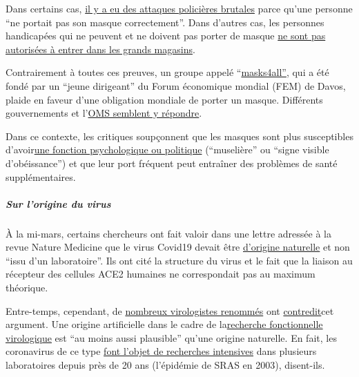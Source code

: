 Dans certains cas,
\href{https://twitter.com/DrRJKavanagh/status/1260739779177656325}{il y
a eu des attaques policières brutales} parce qu'une personne ``ne
portait pas son masque correctement''. Dans d'autres cas, les personnes
handicapées qui ne peuvent et ne doivent pas porter de masque
\href{https://bnn.de/lokales/karlsruhe/maskenpflicht-behinderte-sind-befreit-und-werden-dafuer-teils-beschimpft}{ne
sont pas autorisées à entrer dans les grands magasins}.

Contrairement à toutes ces preuves, un groupe appelé
``\href{https://masks4all.co/about-us/}{masks4all''}, qui a été fondé
par un ``jeune dirigeant'' du Forum économique mondial (FEM) de Davos,
plaide en faveur d'une obligation mondiale de porter un masque.
Différents gouvernements et
l'\href{https://www.businessinsider.com/who-updates-face-masks-recommendations-amid-the-coronavirus-pandemic-2020-6}{OMS
semblent y répondre}.

Dans ce contexte, les critiques soupçonnent que les masques sont plus
susceptibles
d'avoir\href{https://multipolar-magazin.de/artikel/maskenpflicht-gesellschaftliches-klima}{une
fonction psychologique ou politique} (``muselière'' ou ``signe visible
d'obéissance'') et que leur port fréquent peut entraîner des problèmes
de santé supplémentaires.

\hypertarget{sur-lorigine-du-virus}{%
\subparagraph{\texorpdfstring{\textbf{Sur l'origine du
virus}}{Sur l'origine du virus}}\label{sur-lorigine-du-virus}}

À la mi-mars, certains chercheurs ont fait valoir dans une lettre
adressée à la revue Nature Medicine que le virus Covid19 devait être
\href{https://www.nature.com/articles/s41591-020-0820-9}{d'origine
naturelle} et non ``issu d'un laboratoire''. Ils ont cité la structure
du virus et le fait que la liaison au récepteur des cellules ACE2
humaines ne correspondait pas au maximum théorique.

Entre-temps, cependant, de
\href{https://gmwatch.org/en/news/latest-news/19412-lab-escape-theory-of-sars-cov-2-origin-gaining-scientific-support}{nombreux
virologistes renommés} ont
\href{https://www.independentsciencenews.org/health/the-case-is-building-that-covid-19-had-a-lab-origin/}{contredit}cet
argument. Une origine artificielle dans le cadre de
la\href{https://medium.com/\%40yurideigin/lab-made-cov2-genealogy-through-the-lens-of-gain-of-function-research-f96dd7413748}{recherche
fonctionnelle virologique} est ``au moins aussi plausible'' qu'une
origine naturelle. En fait, les coronavirus de ce type
\href{https://gmwatch.org/en/news/latest-news/19410-chinese-and-us-scientists-genetically-engineered-bat-coronaviruses-in-dangerous-gain-of-function-research-stretching-back-years}{font
l'objet de recherches intensives} dans plusieurs laboratoires depuis
près de 20 ans (l'épidémie de SRAS en 2003), disent-ils.

